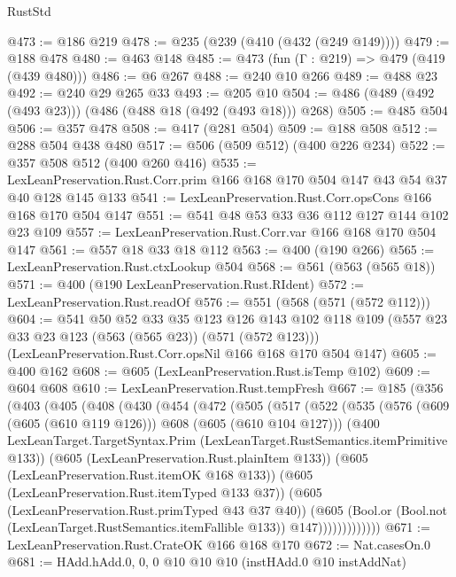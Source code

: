 \begin{lexlean}{RustStd}
\begin{coremodule}
@473 := @186 @219
@478 := @235 (@239 (@410 (@432 (@249 @149))))
@479 := @188 @478
@480 := @463 @148
@485 := @473 (fun (Γ : @219) => @479 (@419 (@439 @480)))
@486 := @6 @267
@488 := @240 @10 @266
@489 := @488 @23
@492 := @240 @29 @265 @33
@493 := @205 @10
@504 := @486 (@489 (@492 (@493 @23))) (@486 (@488 @18 (@492 (@493 @18))) @268)
@505 := @485 @504
@506 := @357 @478
@508 := @417 (@281 @504)
@509 := @188 @508
@512 := @288 @504 @438 @480
@517 := @506 (@509 @512) (@400 @226 @234)
@522 := @357 @508 @512 (@400 @260 @416)
@535 := LexLeanPreservation.Rust.Corr.prim @166 @168 @170 @504 @147 @43 @54 @37 @40 @128 @145 @133
@541 := LexLeanPreservation.Rust.Corr.opsCons @166 @168 @170 @504 @147
@551 := @541 @48 @53 @33 @36 @112 @127 @144 @102 @23 @109
@557 := LexLeanPreservation.Rust.Corr.var @166 @168 @170 @504 @147
@561 := @557 @18 @33 @18 @112
@563 := @400 (@190 @266)
@565 := LexLeanPreservation.Rust.ctxLookup @504
@568 := @561 (@563 (@565 @18))
@571 := @400 (@190 LexLeanPreservation.Rust.RIdent)
@572 := LexLeanPreservation.Rust.readOf
@576 := @551 (@568 (@571 (@572 @112)))
@604 := @541
    @50
    @52
    @33
    @35
    @123
    @126
    @143
    @102
    @118
    @109
    (@557 @23 @33 @23 @123 (@563 (@565 @23)) (@571 (@572 @123)))
    (LexLeanPreservation.Rust.Corr.opsNil @166 @168 @170 @504 @147)
@605 := @400 @162
@608 := @605 (LexLeanPreservation.Rust.isTemp @102)
@609 := @604 @608
@610 := LexLeanPreservation.Rust.tempFresh
@667 := @185
    (@356
      (@403
        (@405
          (@408
            (@430
              (@454
                (@472
                  (@505
                    (@517
                      (@522
                        (@535
                          (@576 (@609 (@605 (@610 @119 @126))) @608 (@605 (@610 @104 @127)))
                          (@400
                            LexLeanTarget.TargetSyntax.Prim
                            (LexLeanTarget.RustSemantics.itemPrimitive @133))
                          (@605 (LexLeanPreservation.Rust.plainItem @133))
                          (@605 (LexLeanPreservation.Rust.itemOK @168 @133))
                          (@605 (LexLeanPreservation.Rust.itemTyped @133 @37))
                          (@605 (LexLeanPreservation.Rust.primTyped @43 @37 @40))
                          (@605
                            (Bool.or
                              (Bool.not (LexLeanTarget.RustSemantics.itemFallible @133))
                              @147)))))))))))))
@671 := LexLeanPreservation.Rust.CrateOK @166 @168 @170
@672 := Nat.casesOn.{0}
@681 := HAdd.hAdd.{0, 0, 0} @10 @10 @10 (instHAdd.{0} @10 instAddNat)

\end{coremodule}
\end{lexlean}
